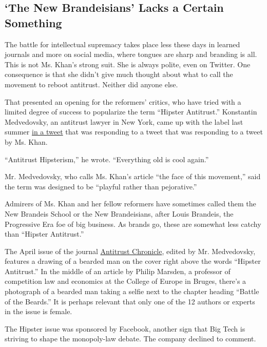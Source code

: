 \hypertarget{the-new-brandeisians-lacks-a-certain-something}{%
\subsection{`The New Brandeisians' Lacks a Certain
Something}\label{the-new-brandeisians-lacks-a-certain-something}}

The battle for intellectual supremacy takes place less these days in
learned journals and more on social media, where tongues are sharp and
branding is all. This is not Ms. Khan's strong suit. She is always
polite, even on Twitter. One consequence is that she didn't give much
thought about what to call the movement to reboot antitrust. Neither did
anyone else.

That presented an opening for the reformers' critics, who have tried
with a limited degree of success to popularize the term ``Hipster
Antitrust.'' Konstantin Medvedovsky, an antitrust lawyer in New York,
came up with the label last summer
\href{https://twitter.com/kmedved/status/876869328934711296}{in a tweet}
that was responding to a tweet that was responding to a tweet by Ms.
Khan.

``Antitrust Hipsterism,'' he wrote. ``Everything old is cool again.''

Mr. Medvedovsky, who calls Ms. Khan's article ``the face of this
movement,'' said the term was designed to be ``playful rather than
pejorative.''

Admirers of Ms. Khan and her fellow reformers have sometimes called them
the New Brandeis School or the New Brandeisians, after Louis Brandeis,
the Progressive Era foe of big business. As brands go, these are
somewhat less catchy than ``Hipster Antitrust.''

The April issue of the journal
\href{https://www.competitionpolicyinternational.com/wp-content/uploads/2018/05/AC_APRIL.pdf}{Antitrust
Chronicle}, edited by Mr. Medvedovsky, features a drawing of a bearded
man on the cover right above the words ``Hipster Antitrust.'' In the
middle of an article by Philip Marsden, a professor of competition law
and economics at the College of Europe in Bruges, there's a photograph
of a bearded man taking a selfie next to the chapter heading ``Battle of
the Beards.'' It is perhaps relevant that only one of the 12 authors or
experts in the issue is female.

The Hipster issue was sponsored by Facebook, another sign that Big Tech
is striving to shape the monopoly-law debate. The company declined to
comment.

